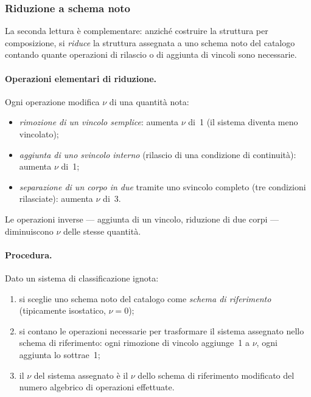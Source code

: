 \subsubsection{Riduzione a schema noto}
\label{sec:riduzione_schema}

La seconda lettura è complementare: anziché costruire la
struttura per composizione, si \emph{riduce} la struttura
assegnata a uno schema noto del catalogo contando quante
operazioni di rilascio o di aggiunta di vincoli sono
necessarie.

\paragraph{Operazioni elementari di riduzione.}
Ogni operazione modifica $\nu$ di una quantità nota:
\begin{itemize}[nosep]
	\item \emph{rimozione di un vincolo semplice}: aumenta
	$\nu$ di~1 (il sistema diventa meno vincolato);
	\item \emph{aggiunta di uno svincolo interno}
	(rilascio di una condizione di continuità):
	aumenta $\nu$ di~1;
	\item \emph{separazione di un corpo in due} tramite
	uno svincolo completo (tre condizioni rilasciate):
	aumenta $\nu$ di~3.
\end{itemize}
Le operazioni inverse --- aggiunta di un vincolo, riduzione
di due corpi --- diminuiscono $\nu$ delle stesse quantità.

\paragraph{Procedura.}
Dato un sistema di classificazione ignota:
\begin{enumerate}[label=(\arabic*), nosep]
	\item si sceglie uno schema noto del catalogo come
	\emph{schema di riferimento} (tipicamente isostatico,
	$\nu = 0$);
	\item si contano le operazioni necessarie per
	trasformare il sistema assegnato nello schema di
	riferimento: ogni rimozione di vincolo aggiunge~1
	a $\nu$, ogni aggiunta lo sottrae~1;
	\item il $\nu$ del sistema assegnato è il $\nu$ dello
	schema di riferimento modificato del numero algebrico
	di operazioni effettuate.
\end{enumerate}

